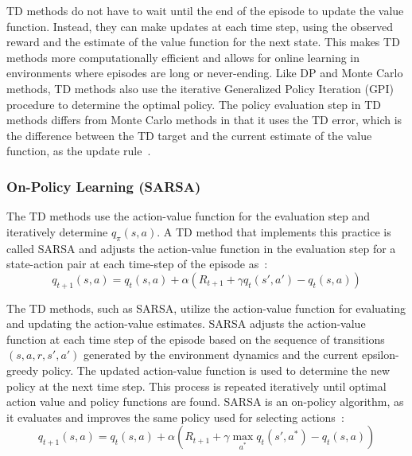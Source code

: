 \documentclass[../xlapes02]{subfiles}
\begin{document}
    TD methods do not have to wait until the end of the episode to update the value function. Instead, they can make updates at each time step, using the observed reward and the estimate of the value function for the next state. This makes TD methods more computationally efficient and allows for online learning in environments where episodes are long or never-ending. Like DP and Monte Carlo methods, TD methods also use the iterative Generalized Policy Iteration (GPI) procedure to determine the optimal policy. The policy evaluation step in TD methods differs from Monte Carlo methods in that it uses the TD error, which is the difference between the TD target and the current estimate of the value function, as the update rule~\cite{sutton2018reinforcement}.

    \subsubsection{On-Policy Learning (SARSA)}\label{sec:td-sarsa}
    The TD methods use the action-value function for the evaluation step and iteratively determine $q_\pi(s,a)$. A TD method that implements this practice is called SARSA and adjusts the action-value function in the evaluation step for a state-action pair at each time-step of the episode as~\cite{sutton2018reinforcement, rl-course-david-silver}:
    \begin{equation}
        q_{t+1}(s,a)=q_t(s,a)+\alpha\left(R_{t+1}+\gamma q_t(s',a')-q_t(s,a)\right)
    \end{equation}

    The TD methods, such as SARSA, utilize the action-value function for evaluating and updating the action-value estimates. SARSA adjusts the action-value function at each time step of the episode based on the sequence of transitions $ (s, a, r, s', a') $ generated by the environment dynamics and the current epsilon-greedy policy. The updated action-value function is used to determine the new policy at the next time step. This process is repeated iteratively until optimal action value and policy functions are found. SARSA is an on-policy algorithm, as it evaluates and improves the same policy used for selecting actions~\cite{rl-course-david-silver}:
    \begin{equation}
        q_{t+1}(s,a)=q_t(s,a)+\alpha\left(R_{t+1}+\gamma\max_{a^*}q_t(s',a^*)-q_t(s,a)\right)
    \end{equation}
\end{document}
